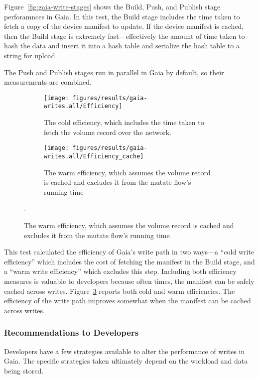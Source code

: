 Figure~\ref{fig:gaia-write-stages} shows the Build, Push, and Publish stage
perforamnces in Gaia.  In this test, the Build stage includes
the time taken to fetch a copy of the device manifest to update.  If the device
manifest is cached, then the Build stage is extremely fast---effectively the amount of
time taken to hash the data and insert it into a hash table and serialize the
hash table to a string for upload.

The Push and Publish stages run in parallel in Gaia by default, so their
measurements are combined.

\begin{figure}[htp!]
   \centering
   \caption{Box-and-wiskers plots of Gaia's write efficiencies.}
   \begin{subfigure}[b]{.8\textwidth}
      \texttt{[image: figures/results/gaia-writes.all/Efficiency]}
      \label{fig:gaia-read-getmanifest}
      \caption{The cold efficiency, which includes the time taken to fetch the
      volume record over the network.}
   \end{subfigure}
   \begin{subfigure}[b]{.8\textwidth}
      \texttt{[image: figures/results/gaia-writes.all/Efficiency\_cache]}
      \label{fig:gaia-read-discover}
      \caption{The warm efficiency, which assumes the volume record is cached
      and excludes it from the mutate flow's running time}
   \end{subfigure}
   \label{fig:gaia-write-efficiencies}.
\end{figure}

This test calculated the efficiency of Gaia's write path in two ways---a ``cold
write efficiency'' which includes the cost of fetching the manifest in the Build
stage, and a ``warm write efficiency'' which excludes this step.  Including both
efficiency measures is valuable to developers because often times, the manifest
can be safely cached across writes.  Figure~\ref{fig:gaia-write-efficiencies}
reports both cold and warm efficiencies.  The efficiency of the write path
improves somewhat when the manifest can be cached across writes.

\subsubsection{Recommendations to Developers}

Developers have a few strategies available to alter the performance of writes in Gaia.
The specific strategies taken ultimately depend on the workload and data being
stored.

